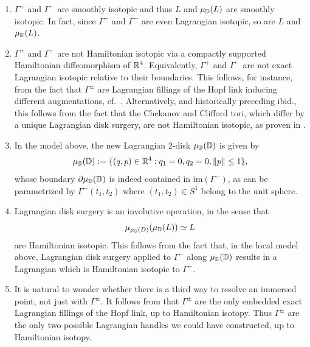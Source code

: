 \begin{enumerate}
    \item $\Gamma^+$ and $\Gamma^-$ are smoothly isotopic and thus $L$ and $\mu_{\mathbb{D}}(L)$ are smoothly isotopic. In fact, since $\Gamma^+$ and $\Gamma^-$ are even Lagrangian isotopic, so are $L$ and $\mu_{\mathbb{D}}(L)$.\\

    \item $\Gamma^+$ and $\Gamma^-$ are not Hamiltonian isotopic via a compactly supported Hamiltonian diffeomorphism of $\mathbb{R}^{4}$. Equivalently, $\Gamma^+$ and $\Gamma^-$ are not exact Lagrangian isotopic relative to their boundaries. This follows, for instance, from the fact that $\Gamma^\pm$ are Lagrangian fillings of the Hopf link inducing different augmentations, cf.~\cite[Section 8.1]{EHK}. Alternatively, and historically preceding ibid., this follows from the fact that the Chekanov and Clifford tori, which differ by a unique Lagrangian disk surgery, are not Hamiltonian isotopic, as proven in \cite[Section 4]{Chekanov96_Torus}.\\

    \item In the model above, the new Lagrangian 2-disk $\mu_{\mathbb{D}}(\mathbb{D})$ is given by
    $$\mu_{\mathbb{D}}(\mathbb{D}):=\{(q,p)\in\mathbb{R}^{4}: q_1=0,q_2=0,\|p\|\leq1\},$$
    whose boundary $\partial\mu_{\mathbb{D}}(\mathbb{D})$ is indeed contained in $\mbox{im}(\Gamma^-)$, as can be parametrized by $\Gamma^-(t_1,t_2)$ where $(t_1,t_2)\in S^{1}$ belong to the unit sphere.\\

    \item Lagrangian disk surgery is an involutive operation, in the sense that
    $$\mu_{\mu_{\mathbb{D}}(D)}(\mu_{\mathbb{D}}(L))\simeq L$$
    are Hamiltonian isotopic. This follows from the fact that, in the local model above, Lagrangian disk surgery applied to $\Gamma^-$ along $\mu_{\mathbb{D}}(\mathbb{D})$ results in a Lagrangian which is Hamiltonian isotopic to $\Gamma^+$.\\

    \item It is natural to wonder whether there is a third way to resolve an immersed point, not just with $\Gamma^\pm$. It follows from \cite[Theorem 1.1]{thomson2026legendrianhopflinkexactly} that $\Gamma^\pm$ are the only embedded exact Lagrangian fillings of the Hopf link, up to Hamiltonian isotopy. Thus $\Gamma^\pm$ are the only two possible Lagrangian handles we could have constructed, up to Hamiltonian isotopy.\\
\end{enumerate}

